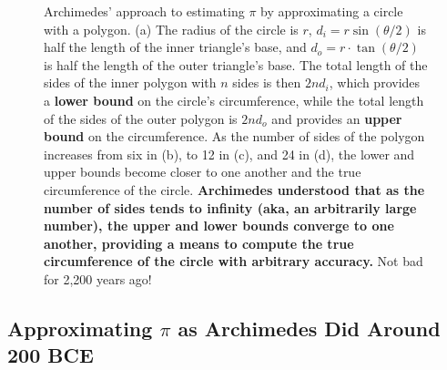 \begin{figure}[hbt!]
\caption[]{Archimedes' approach to estimating $\pi$ by approximating a circle with a polygon. (a) The radius of the circle is $r$, $d_i = r \sin(\theta/2)$ is half the length of the inner triangle's base, and $d_o = r \cdot \tan(\theta/2)$ is half the length of the outer triangle's base. The total length of the sides of the inner polygon with $n$ sides is then $2n d_i$, which provides a \textbf{lower bound} on the circle's circumference, while the total length of the sides of the outer polygon is $2 n d_o$ and provides an \textbf{upper bound} on the circumference. As the number of sides of the polygon increases from six in (b), to 12 in (c), and 24 in (d), the lower and upper bounds become closer to one another and the true circumference of the circle. \textbf{Archimedes understood that as the number of sides tends to infinity (aka, an arbitrarily large number), the upper and lower bounds converge to one another, providing a means to compute the true circumference of the circle with arbitrary accuracy.} Not bad for 2,200 years ago!}
    \label{fig:ArchimedesAndPi}
\end{figure}

\subsection{Approximating \texorpdfstring{$\pi$}{pi} as Archimedes Did Around 200 BCE}



